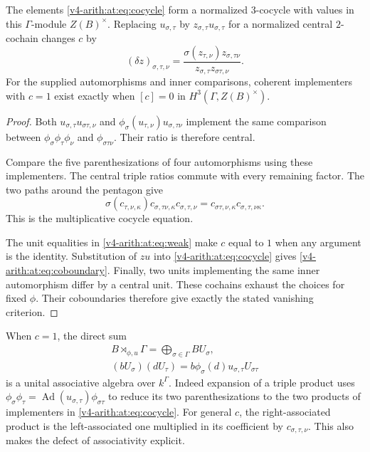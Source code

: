 \begin{proposition}
\label{v4-arith:at:prop:associator}
The elements \eqref{v4-arith:at:eq:cocycle} form a normalized $3$-cocycle
with values in this $\Gamma$-module $Z(B)^\times$. Replacing
$u_{\sigma,\tau}$ by $z_{\sigma,\tau}u_{\sigma,\tau}$ for a
normalized central $2$-cochain changes $c$ by
\begin{equation}\label{v4-arith:at:eq:coboundary}
 (\delta z)_{\sigma,\tau,\nu}
  =\frac{\sigma(z_{\tau,\nu})z_{\sigma,\tau\nu}}
          {z_{\sigma,\tau}z_{\sigma\tau,\nu}}.
\end{equation}
For the supplied automorphisms and inner comparisons, coherent
implementers with $c=1$ exist exactly when
$[c]=0$ in $H^3(\Gamma,Z(B)^\times)$.
\end{proposition}
\begin{proof}
Both $u_{\sigma,\tau}u_{\sigma\tau,\nu}$ and
$\phi_\sigma(u_{\tau,\nu})u_{\sigma,\tau\nu}$ implement the
same comparison between
$\phi_\sigma\phi_\tau\phi_\nu$ and $\phi_{\sigma\tau\nu}$.
Their ratio is therefore central.

Compare the five
parenthesizations of four automorphisms using these implementers.
The central triple ratios commute with every remaining factor.
The two paths around the pentagon give
\[
 \sigma(c_{\tau,\nu,\kappa})
 c_{\sigma,\tau\nu,\kappa}c_{\sigma,\tau,\nu}
 =c_{\sigma\tau,\nu,\kappa}c_{\sigma,\tau,\nu\kappa}.
\]
This is the multiplicative cocycle equation.

The unit equalities
in \eqref{v4-arith:at:eq:weak} make $c$ equal to $1$ when any argument is
the identity. Substitution of $zu$ into
\eqref{v4-arith:at:eq:cocycle} gives \eqref{v4-arith:at:eq:coboundary}.
Finally, two units implementing the same inner automorphism differ
by a central unit. These cochains exhaust the choices for fixed
\(\phi\). Their coboundaries therefore give exactly the stated
vanishing criterion.
\end{proof}

When $c=1$, the direct sum
\begin{equation}\label{v4-arith:at:eq:crossed}
\begin{gathered}
 B\rtimes_{\phi,u}\Gamma=\bigoplus_{\sigma\in\Gamma}BU_\sigma,
 \\
 (bU_\sigma)(dU_\tau)
   =b\phi_\sigma(d)u_{\sigma,\tau}U_{\sigma\tau}
\end{gathered}
\end{equation}
is a unital associative algebra over $k^\Gamma$.
Indeed expansion of a triple product uses
$\phi_\sigma\phi_\tau=\operatorname{Ad}(u_{\sigma,\tau})
\phi_{\sigma\tau}$ to reduce its two parenthesizations to the
two products of implementers in \eqref{v4-arith:at:eq:cocycle}.
For general $c$, the right-associated product is the left-associated
one multiplied in its coefficient by $c_{\sigma,\tau,\nu}$.
This also makes the defect of associativity explicit.

